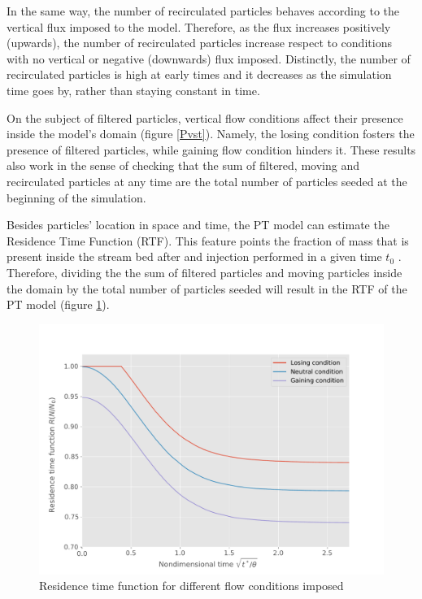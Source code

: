 \documentclass[draft,linenumbers]{agujournal2018}
\begin{document}
In the same way, the number of recirculated particles behaves according to the vertical flux imposed to the model. Therefore, as the flux increases positively (upwards), the number of recirculated particles increase respect to conditions with no vertical or negative (downwards) flux imposed. Distinctly, the number of recirculated particles is high at early times and it decreases as the simulation time goes by, rather than staying constant in time. 

On the subject of filtered particles, vertical flow conditions affect their presence inside the model's domain (figure \ref{Pvst}). Namely, the losing condition fosters the presence of filtered particles, while gaining flow condition hinders it. These results also work in the sense of checking that the sum of filtered, moving and recirculated particles at any time are the total number of particles seeded at the beginning of the simulation. 

Besides particles' location in space and time, the PT model can estimate the Residence Time Function (RTF). This feature points the fraction of mass that is present inside the stream bed after and injection performed in a given time $t_0$ \citep{Elliott1997,Packman2000}. Therefore, dividing the the sum of filtered particles and moving particles inside the domain by the total number of particles seeded will result in the RTF of the PT model (figure \ref{RTF}).

\begin{figure}[ht]
\centering
\includegraphics[trim=0.2cm 0.2cm 0.2cm 0.2cm, width=35pc]
{190131_RTF.pdf}
\caption{Residence time function for different flow conditions imposed}
\label{RTF}
\end{figure}
\end{document}

